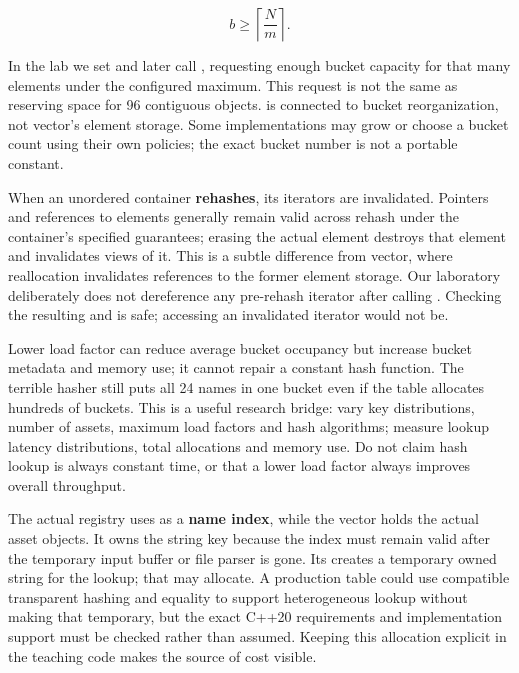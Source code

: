 \[
b \ge \left\lceil \frac{N}{m} \right\rceil.
\]

In the lab we set  and later call , requesting enough bucket capacity for that many elements under the configured maximum. This request is not the same as reserving space for 96 contiguous objects.  is connected to bucket reorganization, not vector's element storage. Some implementations may grow or choose a bucket count using their own policies; the exact bucket number is not a portable constant.

When an unordered container \textbf{rehashes}, its iterators are invalidated. Pointers and references to elements generally remain valid across rehash under the container's specified guarantees; erasing the actual element destroys that element and invalidates views of it. This is a subtle difference from vector, where reallocation invalidates references to the former element storage. Our laboratory deliberately does not dereference any pre-rehash iterator after calling . Checking the resulting  and  is safe; accessing an invalidated iterator would not be.

Lower load factor can reduce average bucket occupancy but increase bucket metadata and memory use; it cannot repair a constant hash function. The terrible hasher still puts all 24 names in one bucket even if the table allocates hundreds of buckets. This is a useful research bridge: vary key distributions, number of assets, maximum load factors and hash algorithms; measure lookup latency distributions, total allocations and memory use. Do not claim hash lookup is always constant time, or that a lower load factor always improves overall throughput.

The actual registry uses  as a \textbf{name index}, while the vector holds the actual asset objects. It owns the string key because the index must remain valid after the temporary input buffer or file parser is gone. Its  creates a temporary owned string for the lookup; that may allocate. A production table could use compatible transparent hashing and equality to support heterogeneous lookup without making that temporary, but the exact C++20 requirements and implementation support must be checked rather than assumed. Keeping this allocation explicit in the teaching code makes the source of cost visible.

